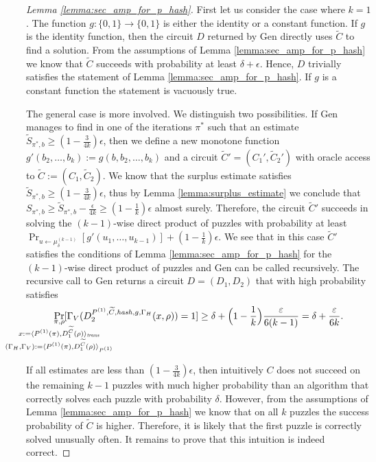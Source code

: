 \begin{proof}[Lemma \ref{lemma:sec_amp_for_p_hash}]
First let us consider the case where $k=1$. The function $g: \{0,1\} \rightarrow \{0,1\}$ is either the identity or a constant function.
If $g$ is the identity function, then the circuit $D$ returned by Gen directly uses $\widetilde{C}$ to find a solution.
From the assumptions of Lemma \ref{lemma:sec_amp_for_p_hash} we know that $\widetilde{C}$ succeeds with probability at least
$\delta + \epsilon$. Hence, $D$ trivially satisfies the statement of Lemma \ref{lemma:sec_amp_for_p_hash}.
If $g$ is a constant function the statement is vacuously true.

The general case is more involved. We distinguish two possibilities.
If Gen manages to find in one of the iterations $\pi^*$ such that an estimate
$\widetilde{S}_{\pi^*,b} \geq (1-\frac{3}{4k})\epsilon$, then we define a new monotone function
$g'(b_2, \dots, b_k) := g(b, b_2, \dots, b_k)$ and a circuit $\widetilde{C}' = (C_1', \widetilde{C}_2')$ with oracle access to $\widetilde{C} := (C_1, \widetilde{C}_2)$.
We know that the surplus estimate satisfies $\widetilde{S}_{\pi^*, b} \geq (1 - \frac{3}{4k})\epsilon$, thus by Lemma \ref{lemma:surplus_estimate}
we conclude that $S_{\pi^*,b} \geq \widetilde{S}_{\pi^*, b} - \frac{\epsilon}{4k} \geq (1 - \frac{1}{k})\epsilon$ almost surely.
Therefore, the circuit $\widetilde{C}'$ succeeds in solving the $(k-1)$-wise direct product of puzzles with probability
at least $\Pr_{u \leftarrow \mu^{(k-1)}_{\delta}}[g'(u_1,\dots, u_{k-1} )] + (1 - \frac{1}{k})\epsilon$.
We see that in this case $\widetilde{C}'$ satisfies the conditions of Lemma \ref{lemma:sec_amp_for_p_hash}
for the $(k-1)$-wise direct product of puzzles and Gen can be called recursively.
The recursive call to Gen returns a circuit $D = (D_1, D_2)$ that with high probability satisfies
\begin{align*}
  \underset{
    \mathclap{
      \substack{
        \pi, \rho \\
        x := \langle P^{(1)}(\pi), D_1^{\widetilde{C}}(\rho) \rangle_{\mathit{trans}} \\
        (\Gamma_H, \Gamma_V) := \langle P^{(1)}(\pi), D_1^{\widetilde{C}}(\rho) \rangle_{P^{(1)}}}}}
  {\Pr}[\Gamma_V(D_2^{P^{(1)}, \widetilde{C}, \hash, g, \Gamma_H}(x, \rho)) = 1] \geq \delta + \Bigl(1 - \frac{1}{k}\Bigr)\frac{\epsilon}{6(k-1)} =
  \delta + \frac{\epsilon}{6k}.
\end{align*}

If all estimates are less than $(1-\frac{3}{4k})\epsilon$, then intuitively $C$
does not succeed on the remaining $k-1$ puzzles with much higher probability than
an algorithm that correctly solves each puzzle with probability $\delta$.
However, from the assumptions of Lemma \ref{lemma:sec_amp_for_p_hash} we know that on all
$k$ puzzles the success probability of $\widetilde{C}$ is higher.
Therefore, it is likely that the first puzzle is correctly solved unusually often.
It remains to prove that this intuition is indeed correct.


\end{proof}
